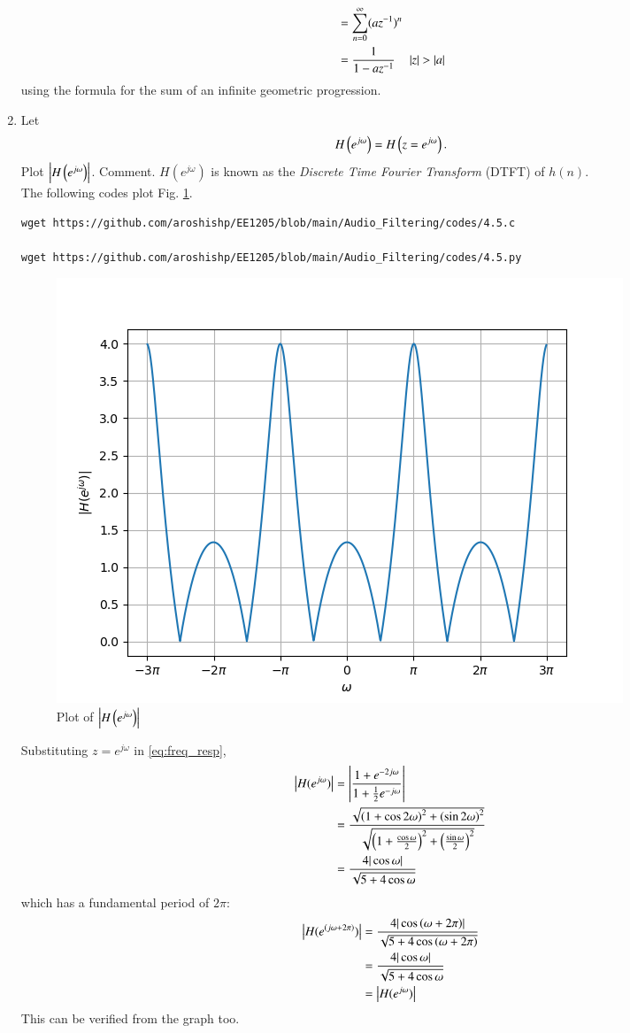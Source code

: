 \documentclass[journal,12pt,twocolumn]{IEEEtran}
\theoremstyle{remark}
\renewcommand\thesection{\arabic{section}}
\numberwithin{equation}{subsection}
\begin{document}
\begin{enumerate}[label=\thesection.\arabic*]
\begin{align}
    &= \sum_{n=0}^{\infty}(az^{-1})^n\\
    &= \frac{1}{1 - az^{-1}} \quad \left\vert z\right\vert > \left\vert a\right\vert
\end{align}
using the formula for the sum of an infinite geometric progression.
\item 
Let
\begin{equation}
H\left(e^{j \omega}\right) = H\left(z = e^{j \omega}\right).
\end{equation}
Plot $\left\vert H\left(e^{j \omega}\right)\right\vert$.  Comment.  $H(e^{j \omega})$ is
known as the {\em Discrete Time Fourier Transform} (DTFT) of $h(n)$.
\\
\solution The following codes plot Fig. \ref{fig:dtft}.
\begin{lstlisting}
wget https://github.com/aroshishp/EE1205/blob/main/Audio_Filtering/codes/4.5.c

wget https://github.com/aroshishp/EE1205/blob/main/Audio_Filtering/codes/4.5.py
\end{lstlisting}
\begin{figure}[!h]
\centering
\includegraphics[width=\columnwidth]{figs/4.5.png}
\caption{Plot of $\left\vert H\left(e^{j\omega}\right)\right\vert$}
\label{fig:dtft}
\end{figure}

Substituting $z = e^{j \omega}$ in \eqref{eq:freq_resp},
\begin{align}
    \left\vert H(e^{j\omega})\right\vert &= \left\vert\frac{1 + e^{-2j\omega}}{1 + \frac{1}{2}e^{-j\omega}}\right\vert\\
    &= \frac{\sqrt{\left(1 + \cos{2\omega}\right)^2 + \left(\sin{2\omega}\right)^2}}{\sqrt{\left(1 + \frac{\cos{\omega}}{2}\right)^2 + \left(\frac{\sin{\omega}}{2}\right)^2}}\\
    &= \frac{4|\cos{\omega}|}{\sqrt{5 + 4\cos{\omega}}}
\end{align}
which has a fundamental period of $2\pi$:
\begin{align}
    \left\vert H(e^{\left(j\omega + 2\pi\right)})\right\vert &= \frac{4|\cos{\ensuremath{\left(\omega + 2\pi\right)}}|}{\sqrt{5 + 4\cos{\ensuremath{\left(\omega + 2\pi\right)}}}}\\
    &= \frac{4|\cos{\omega}|}{\sqrt{5 + 4\cos{\omega}}}\\
    &= \left\vert H(e^{j\omega})\right\vert
\end{align}
This can be verified from the graph too.


\end{enumerate}
\end{document}

